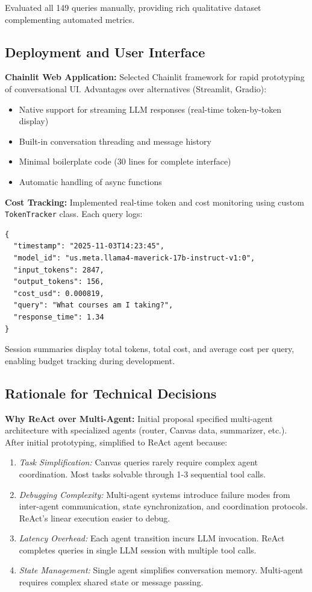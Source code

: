 \documentclass{article}
\begin{document}
Evaluated all 149 queries manually, providing rich qualitative dataset complementing automated metrics.

\subsection{Deployment and User Interface}

\textbf{Chainlit Web Application:} Selected Chainlit framework for rapid prototyping of conversational UI. Advantages over alternatives (Streamlit, Gradio):

\begin{itemize}
    \item Native support for streaming LLM responses (real-time token-by-token display)
    \item Built-in conversation threading and message history
    \item Minimal boilerplate code (30 lines for complete interface)
    \item Automatic handling of async functions
\end{itemize}

\textbf{Cost Tracking:} Implemented real-time token and cost monitoring using custom \texttt{TokenTracker} class. Each query logs:

\begin{verbatim}
{
  "timestamp": "2025-11-03T14:23:45",
  "model_id": "us.meta.llama4-maverick-17b-instruct-v1:0",
  "input_tokens": 2847,
  "output_tokens": 156,
  "cost_usd": 0.000819,
  "query": "What courses am I taking?",
  "response_time": 1.34
}
\end{verbatim}

Session summaries display total tokens, total cost, and average cost per query, enabling budget tracking during development.

\subsection{Rationale for Technical Decisions}

\textbf{Why ReAct over Multi-Agent:} Initial proposal specified multi-agent architecture with specialized agents (router, Canvas data, summarizer, etc.). After initial prototyping, simplified to ReAct agent because:

\begin{enumerate}
    \item \textit{Task Simplification:} Canvas queries rarely require complex agent coordination. Most tasks solvable through 1-3 sequential tool calls.
    \item \textit{Debugging Complexity:} Multi-agent systems introduce failure modes from inter-agent communication, state synchronization, and coordination protocols. ReAct's linear execution easier to debug.
    \item \textit{Latency Overhead:} Each agent transition incurs LLM invocation. ReAct completes queries in single LLM session with multiple tool calls.
    \item \textit{State Management:} Single agent simplifies conversation memory. Multi-agent requires complex shared state or message passing.
\end{enumerate}
\end{document}
